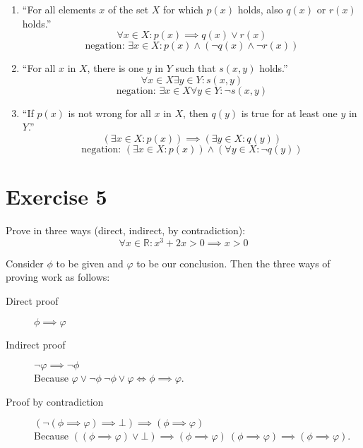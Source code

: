 \documentclass[a4paper]{article}
\theoremstyle{definition}
\begin{document}
\begin{enumerate}
  \item \enquote{For all elements $x$ of the set $X$ for which $p(x)$ holds, also $q(x)$ or $r(x)$ holds.}
    \[ \forall x \in X: p(x) \implies q(x) \lor r(x) \]
    \[ \text{negation: }  \exists x \in X: p(x) \land (\neg q(x) \land \neg r(x)) \]
  \item \enquote{For all $x$ in $X$, there is one $y$ in $Y$ such that $s(x,y)$ holds.}
    \[ \forall x \in X \exists y \in Y: s(x, y) \]
    \[ \text{negation: }  \exists x \in X \forall y \in Y: \neg s(x, y) \]
  \item \enquote{If $p(x)$ is not wrong for all $x$ in $X$, then $q(y)$ is true for at least one $y$ in $Y$.}
    \[ (\exists x \in X: p(x)) \implies (\exists y \in X: q(y)) \]
    \[ \text{negation: }  (\exists x \in X: p(x)) \land (\forall y \in X: \neg q(y)) \]
\end{enumerate}


\section{Exercise 5}
\begin{ex}
  Prove in three ways (direct, indirect, by contradiction):
  \[ \forall x \in \mathbb R: x^3 + 2x > 0 \implies x > 0 \]
\end{ex}

Consider $\phi$ to be given and $\varphi$ to be our conclusion.
Then the three ways of proving work as follows:
\begin{description}
  \item[Direct proof] $\phi \implies \varphi$
  \item[Indirect proof] $\neg\varphi \implies \neg\phi$ \\
    Because $\varphi \lor \neg\phi \ \neg\phi \lor \varphi \Longleftrightarrow \phi \implies \varphi$.
  \item[Proof by contradiction] $(\neg (\phi \implies \varphi) \implies \bot) \implies (\phi \implies \varphi)$ \\
    Because $((\phi \implies \varphi) \lor \bot) \implies (\phi \implies \varphi)
    \ (\phi \implies \varphi) \implies (\phi \implies \varphi)$.
\end{description}
\end{document}
